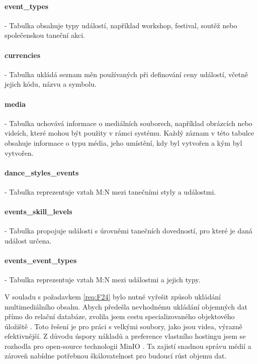 \paragraph{event\_types}- Tabulka obsahuje typy událostí, například workshop, festival, soutěž 
nebo společenskou taneční akci.

\paragraph{currencies}- Tabulka ukládá seznam měn používaných při definování ceny událostí, 
včetně jejich kódu, názvu a symbolu.

\paragraph{media}- Tabulka uchovává informace o mediálních souborech, například obrázcích nebo videích, které mohou být použity v rámci systému. Každý záznam v této tabulce obsahuje informace o typu média, jeho umístění, kdy byl vytvořen a kým byl vytvořen.

\paragraph{dance\_styles\_events}-
Tabulka reprezentuje vztah M:N mezi tanečními styly 
a událostmi.

\paragraph{events\_skill\_levels}-
Tabulka propojuje události s úrovněmi tanečních dovedností, 
pro které je daná událost určena.

\paragraph{events\_event\_types}-
Tabulka reprezentuje vztah M:N mezi událostmi a 
jejich typy.

V souladu s požadavkem \ref{req:F24} bylo nutné vyřešit způsob ukládání multimediálního obsahu. Abych předešla nevhodnému ukládání objemných dat přímo do relační databáze, zvolila jsem cestu specializovaného objektového úložiště \cite{objective_storage}. Toto řešení je pro práci s velkými soubory, jako jsou videa, výrazně efektivnější. Z důvodu úspory nákladů a preference vlastního hostingu jsem se rozhodla pro open-source technologii MinIO \cite{minio_github}. Ta zajistí snadnou správu médií a zároveň nabídne potřebnou škálovatelnost pro budoucí růst objemu dat.
